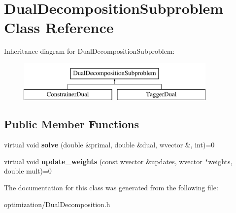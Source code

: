 \hypertarget{classDualDecompositionSubproblem}{
\section{DualDecompositionSubproblem Class Reference}
\label{classDualDecompositionSubproblem}
}
Inheritance diagram for DualDecompositionSubproblem:\begin{figure}[H]
\begin{center}
\leavevmode
\includegraphics[height=2cm]{classDualDecompositionSubproblem}
\end{center}
\end{figure}
\subsection*{Public Member Functions}
\begin{DoxyCompactItemize}
\item 
\hypertarget{classDualDecompositionSubproblem_aac234786c13091898be348dc0056a036}{
virtual void {\bfseries solve} (double \&primal, double \&dual, wvector \&, int)=0}
\label{classDualDecompositionSubproblem_aac234786c13091898be348dc0056a036}

\item 
\hypertarget{classDualDecompositionSubproblem_a6d26fcb23023d5b03d54b3d191531b02}{
virtual void {\bfseries update\_\-weights} (const wvector \&updates, wvector $\ast$weights, double mult)=0}
\label{classDualDecompositionSubproblem_a6d26fcb23023d5b03d54b3d191531b02}

\end{DoxyCompactItemize}


The documentation for this class was generated from the following file:\begin{DoxyCompactItemize}
\item 
optimization/DualDecomposition.h\end{DoxyCompactItemize}
